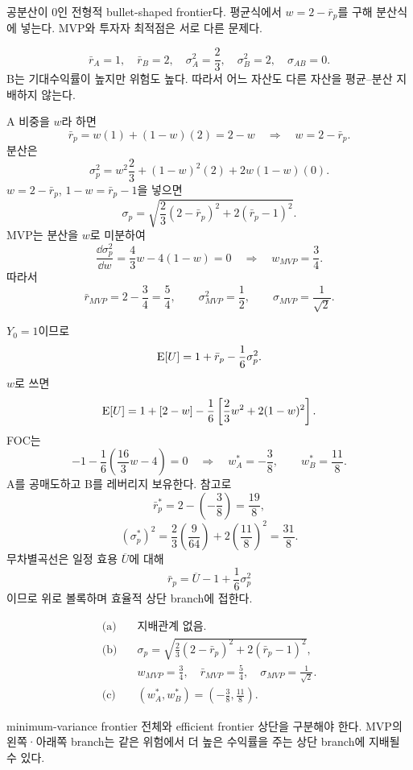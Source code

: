 \begin{strategybox}
공분산이 0인 전형적 bullet-shaped frontier다. 평균식에서 $w=2-\bar r_p$를 구해 분산식에 넣는다. MVP와 투자자 최적점은 서로 다른 문제다.
\end{strategybox}

\begin{solutionbox}
\[
\bar r_A=1,\quad\bar r_B=2,
\quad\sigma_A^2=\frac23,\quad\sigma_B^2=2,
\quad\sigma_{AB}=0.
\]
B는 기대수익률이 높지만 위험도 높다. 따라서 어느 자산도 다른 자산을 평균--분산 지배하지 않는다.

A 비중을 $w$라 하면
\[
\bar r_p=w(1)+(1-w)(2)=2-w
\quad\Longrightarrow\quad w=2-\bar r_p.
\]
분산은
\[
\sigma_p^2=w^2\frac23+(1-w)^2(2)+2w(1-w)(0).
\]
$w=2-\bar r_p$, $1-w=\bar r_p-1$을 넣으면
\[
\boxed{\sigma_p=\sqrt{\frac23(2-\bar r_p)^2+2(\bar r_p-1)^2}}.
\]
MVP는 분산을 $w$로 미분하여
\[
\frac{\dd\sigma_p^2}{\dd w}=\frac43w-4(1-w)=0
\quad\Longrightarrow\quad w_{MVP}=\frac34.
\]
따라서
\[
\bar r_{MVP}=2-\frac34=\frac54,
\qquad
\sigma_{MVP}^2=\frac12,
\qquad
\sigma_{MVP}=\frac1{\sqrt2}.
\]

$Y_0=1$이므로
\[
\operatorname{E}[U]=1+\bar r_p-\frac16\sigma_p^2.
\]
$w$로 쓰면
\[
\operatorname{E}[U]=1+[2-w]-\frac16\left[\frac23w^2+2(1-w)^2\right].
\]
FOC는
\[
-1-\frac16\left(\frac{16}{3}w-4\right)=0
\quad\Longrightarrow\quad
\boxed{w_A^*=-\frac38,\qquad w_B^*=\frac{11}{8}}.
\]
A를 공매도하고 B를 레버리지 보유한다. 참고로
\[
\bar r_p^*=2-\left(-\frac38\right)=\frac{19}{8},
\]
\[
(\sigma_p^*)^2=\frac23\left(\frac{9}{64}\right)+2\left(\frac{11}{8}\right)^2
=\frac{31}{8}.
\]
무차별곡선은 일정 효용 $\overline U$에 대해
\[
\bar r_p=\overline U-1+\frac16\sigma_p^2
\]
이므로 위로 볼록하며 효율적 상단 branch에 접한다.
\end{solutionbox}

\begin{answerbox}
\begin{align*}
\text{(a)}\quad &\text{지배관계 없음.}\\
\text{(b)}\quad &\sigma_p=\sqrt{\frac23(2-\bar r_p)^2+2(\bar r_p-1)^2},\\
&w_{MVP}=\frac34,\quad \bar r_{MVP}=\frac54,\quad\sigma_{MVP}=\frac1{\sqrt2}.\\
\text{(c)}\quad &(w_A^*,w_B^*)=\left(-\frac38,\frac{11}{8}\right).
\end{align*}
\end{answerbox}

\begin{warningbox}
minimum-variance frontier 전체와 efficient frontier 상단을 구분해야 한다. MVP의 왼쪽·아래쪽 branch는 같은 위험에서 더 높은 수익률을 주는 상단 branch에 지배될 수 있다.
\end{warningbox}

